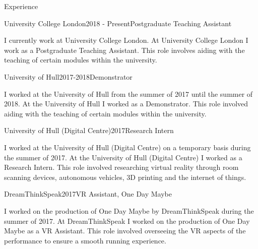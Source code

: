 \documentclass{cv}
\begin{document}
\begin{rSection}{Experience}

\begin{rSubsection}{University College London}{2018 - Present}{Postgraduate Teaching Assistant}{}

\item I currently work at University College London. At University College London I work as a Postgraduate Teaching Assistant. This role involves aiding with the teaching of certain modules within the university.

\end{rSubsection}


\begin{rSubsection}{University of Hull}{2017-2018}{Demonstrator}{}

\item I worked at the University of Hull from the summer of 2017 until the summer of 2018. At the University of Hull I worked as a Demonstrator. This role involved aiding with the teaching of certain modules within the university.

\end{rSubsection}


\begin{rSubsection}{University of Hull (Digital Centre)}{2017}{Research Intern}{}

\item I worked at the University of Hull (Digital Centre) on a temporary basis during the summer of 2017. At the University of Hull (Digital Centre) I worked as a Research Intern. This role involved researching virtual reality through room scanning devices, autonomous vehicles, 3D printing and the internet of things.

\end{rSubsection}


\begin{rSubsection}{DreamThinkSpeak}{2017}{VR Assistant, One Day Maybe}{}

\item I worked on the production of One Day Maybe by DreamThinkSpeak during the summer of 2017. At DreamThinkSpeak I worked on the production of One Day Maybe as a VR Assistant. This role involved overseeing the VR aspects of the performance to ensure a smooth running experience.

\end{rSubsection}

\end{rSection}
\end{document}
